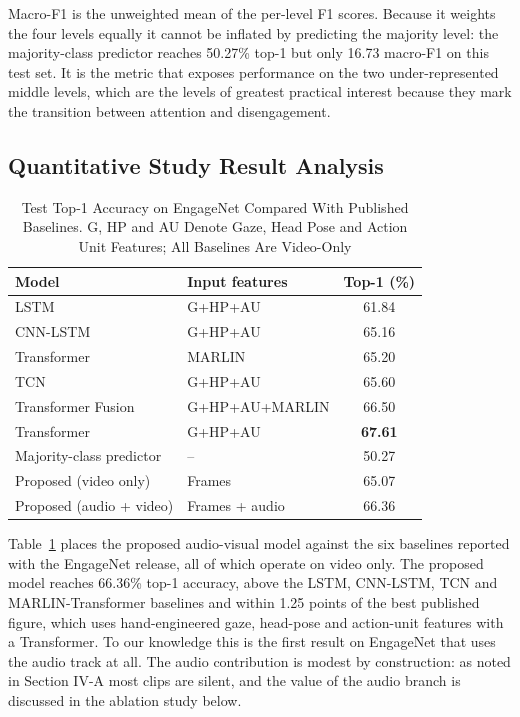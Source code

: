 \documentclass[journal]{IEEEtran}
\begin{document}
Macro-F1 is the unweighted mean of the per-level F1 scores. Because it weights the four levels equally it cannot be inflated by predicting the majority level: the majority-class predictor reaches 50.27\% top-1 but only 16.73 macro-F1 on this test set. It is the metric that exposes performance on the two under-represented middle levels, which are the levels of greatest practical interest because they mark the transition between attention and disengagement.

\subsection{Quantitative Study Result Analysis}

\begin{table}[!t]
\renewcommand{\arraystretch}{1.3}
\caption{Test Top-1 Accuracy on EngageNet Compared With Published Baselines. G, HP and AU Denote Gaze, Head Pose and Action Unit Features; All Baselines Are Video-Only}
\label{tab_baselines}
\centering
\begin{tabular}{|l|l|c|}
\hline
Model & Input features & Top-1 (\%)\\
\hline
LSTM \cite{singh2023engagenet} & G+HP+AU & 61.84\\
CNN-LSTM \cite{singh2023engagenet} & G+HP+AU & 65.16\\
Transformer \cite{singh2023engagenet} & MARLIN & 65.20\\
TCN \cite{singh2023engagenet} & G+HP+AU & 65.60\\
Transformer Fusion \cite{singh2023engagenet} & G+HP+AU+MARLIN & 66.50\\
Transformer \cite{singh2023engagenet} & G+HP+AU & \textbf{67.61}\\
\hline
Majority-class predictor & -- & 50.27\\
Proposed (video only) & Frames & 65.07\\
Proposed (audio + video) & Frames + audio & 66.36\\
\hline
\end{tabular}
\end{table}

Table~\ref{tab_baselines} places the proposed audio-visual model against the six baselines reported with the EngageNet release, all of which operate on video only. The proposed model reaches 66.36\% top-1 accuracy, above the LSTM, CNN-LSTM, TCN and MARLIN-Transformer baselines and within 1.25 points of the best published figure, which uses hand-engineered gaze, head-pose and action-unit features with a Transformer. To our knowledge this is the first result on EngageNet that uses the audio track at all. The audio contribution is modest by construction: as noted in Section IV-A most clips are silent, and the value of the audio branch is discussed in the ablation study below.
\end{document}
